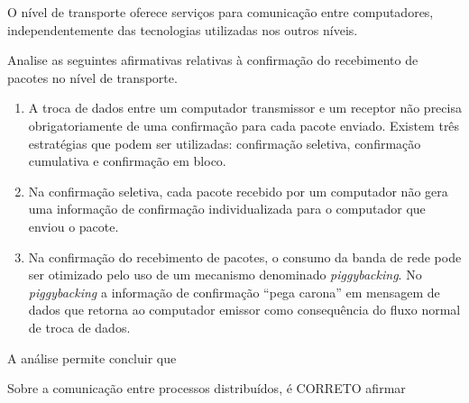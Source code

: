 \documentclass[10pt,a4paper]{article}
\begin{document}
{
\def\AMCbeginQuestion#1#2{\par\noindent{\bf (POSCOMP 2008 - Questão 08)}}
\begin{question}{} O nível de transporte oferece serviços para comunicação entre computadores, independentemente das tecnologias utilizadas nos outros níveis.

Analise as seguintes afirmativas relativas à confirmação do recebimento de pacotes no nível de transporte.
\begin{enumerate}[label=\Roman*.]
\item A troca de dados entre um computador transmissor e um receptor não precisa obrigatoriamente de uma confirmação para cada pacote enviado. Existem três estratégias que podem ser utilizadas: confirmação seletiva, confirmação cumulativa e confirmação em bloco.
\item Na confirmação seletiva, cada pacote recebido por um computador não gera uma informação de confirmação individualizada para o computador que enviou o pacote.
\item Na confirmação do recebimento de pacotes, o consumo da banda de rede pode ser otimizado pelo uso de um mecanismo denominado \textit{piggybacking}. No \textit{piggybacking} a informação de confirmação ``pega carona'' em mensagem de dados que retorna ao computador emissor como consequência do fluxo normal de troca de dados.
\end{enumerate}
A análise permite concluir que
\begin{choices}
\end{choices}
\end{question}
}
%
{
\def\AMCbeginQuestion#1#2{\par\noindent{\bf (POSCOMP 2008 - Questão 14)}}
\begin{question}{} Sobre a comunicação entre processos distribuídos, é CORRETO afirmar
\begin{choices}
\end{choices}
\end{question}
}
\end{document}
